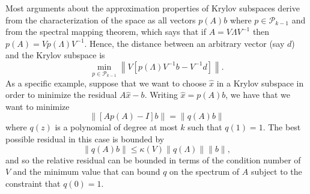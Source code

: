 \documentclass[12pt, leqno]{article} %
\begin{document}
Most arguments about the approximation properties of Krylov subspaces
derive from the characterization of the space as all vectors $p(A) b$
where $p \in \mathcal{P}_{k-1}$ and from the spectral mapping theorem,
which says that if $A = V \Lambda V^{-1}$ then
$p(A) = V p(\Lambda) V^{-1}$.  Hence, the distance between
an arbitrary vector (say $d$) and the Krylov subspace is
\[
  \min_{p \in \mathcal{P}_{k-1}}
  \left\| V \left[ p(\Lambda) V^{-1} b - V^{-1} d \right] \right\|.
\]
As a specific example, suppose that we want to choose $\hat{x}$
in a Krylov subspace in order to minimize the residual $A \hat{x} - b$.
Writing $\hat{x} = p(A) b$, we have that we want to minimize
\[
  \|[A p(A)-I] b\| = \|q(A) b\|
\]
where $q(z)$ is a polynomial of degree at most $k$ such that $q(1) = 1$.
The best possible residual in this case is bounded by
\[
  \|q(A) b\| \leq \kappa(V) \|q(\Lambda)\| \|b\|,
\]
and so the relative residual can be bounded in terms of the condition
number of $V$ and the minimum value that can bound $q$ on the spectrum
of $A$ subject to the constraint that $q(0) = 1$.
\end{document}
